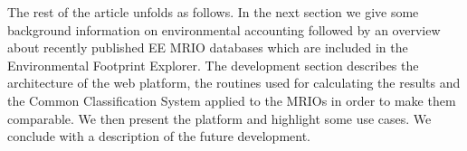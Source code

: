 The rest of the article unfolds as follows. In the next section we give some background information on environmental accounting followed by an overview about recently published EE MRIO databases which are included in the Environmental Footprint Explorer.
The development section describes the architecture of the web platform, the routines used for calculating the results and the Common Classification System \cite{Steen_Olsen_2014} applied to the MRIOs in order to make them comparable.
We then present the platform and highlight some use cases. We conclude with a description of the future development.
